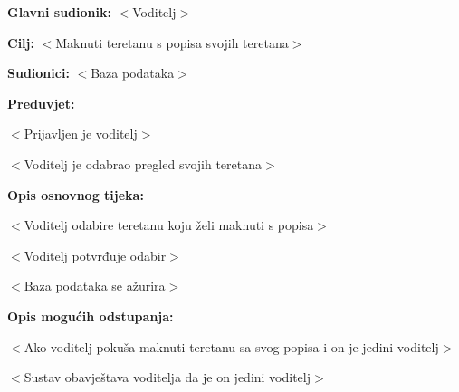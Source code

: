 					\noindent {}
					\begin{packed_item}
	
						\item \textbf{Glavni sudionik: } $<$Voditelj$>$
    						\item  \textbf{Cilj:} $<$Maknuti teretanu s popisa svojih teretana$>$
						\item  \textbf{Sudionici:} $<$Baza podataka$>$
						\item  \textbf{Preduvjet:} 
						\item[] \begin{packed_enum}
	
							\item $<$Prijavljen je voditelj$>$
							\item $<$Voditelj je odabrao pregled svojih teretana$>$

						\end{packed_enum}
						\item  \textbf{Opis osnovnog tijeka:}
						
						\item[] \begin{packed_enum}
	
							\item $<$Voditelj odabire teretanu koju želi maknuti s popisa$>$
							\item $<$Voditelj potvrđuje odabir$>$
							\item $<$Baza podataka se ažurira$>$
						\end{packed_enum}
						
						\item  \textbf{Opis mogućih odstupanja:}
						
						\item[] \begin{packed_item}
	
							\item[1.] $<$Ako voditelj pokuša maknuti teretanu sa svog popisa i on je jedini voditelj$>$
							\item[] \begin{packed_enum}
								
								\item[a)] $<$Sustav obavještava voditelja da je on jedini voditelj$>$
		
								
							\end{packed_enum}
	
							
						\end{packed_item}
					\end{packed_item}
					
